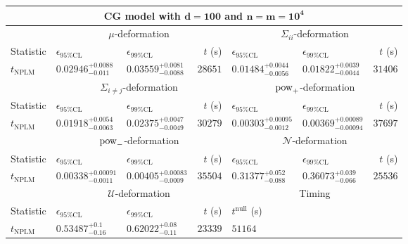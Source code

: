\begin{tabular}{l|llr|llr}
	\toprule
	\multicolumn{7}{c}{{\bf CG model with $\mathbf{d=100}$ and $\mathbf{n=m=10^{4}}$}} \\
	\toprule
	\multicolumn{1}{c}{} & \multicolumn{3}{c}{$\mu$-deformation} & \multicolumn{3}{c}{$\Sigma_{ii}$-deformation} \\
	Statistic & $\epsilon_{95\%\mathrm{CL}}$ & $\epsilon_{99\%\mathrm{CL}}$ & $t$ (s) & $\epsilon_{95\%\mathrm{CL}}$ & $\epsilon_{99\%\mathrm{CL}}$ & $t$ (s) \\
	\midrule
	$t_{\mathrm{NPLM}}$ & $0.02946_{-0.011}^{+0.0088}$ & $0.03559_{-0.0088}^{+0.0081}$ & $28651$ & $0.01484_{-0.0056}^{+0.0044}$ & $0.01822_{-0.0044}^{+0.0039}$ & $31406$ \\
	\toprule
	\multicolumn{1}{c}{} & \multicolumn{3}{c}{$\Sigma_{i\neq j}$-deformation} & \multicolumn{3}{c}{$\rm{pow}_{+}$-deformation} \\
	Statistic & $\epsilon_{95\%\mathrm{CL}}$ & $\epsilon_{99\%\mathrm{CL}}$ & $t$ (s) & $\epsilon_{95\%\mathrm{CL}}$ & $\epsilon_{99\%\mathrm{CL}}$ & $t$ (s) \\
	\midrule
	$t_{\mathrm{NPLM}}$ & $0.01918_{-0.0063}^{+0.0054}$ & $0.02375_{-0.0049}^{+0.0047}$ & $30279$ & $0.00303_{-0.0012}^{+0.00095}$ & $0.00369_{-0.00094}^{+0.00089}$ & $37697$ \\
	\toprule
	\multicolumn{1}{c}{} & \multicolumn{3}{c}{$\rm{pow}_{-}$-deformation} & \multicolumn{3}{c}{$\mathcal{N}$-deformation} \\
	Statistic & $\epsilon_{95\%\mathrm{CL}}$ & $\epsilon_{99\%\mathrm{CL}}$ & $t$ (s) & $\epsilon_{95\%\mathrm{CL}}$ & $\epsilon_{99\%\mathrm{CL}}$ & $t$ (s) \\
	\midrule
	$t_{\mathrm{NPLM}}$ & $0.00338_{-0.0011}^{+0.00091}$ & $0.00405_{-0.0009}^{+0.00083}$ & $35504$ & $0.31377_{-0.088}^{+0.052}$ & $0.36073_{-0.066}^{+0.039}$ & $25536$ \\
	\toprule
	\multicolumn{1}{c}{} & \multicolumn{3}{c}{$\mathcal{U}$-deformation} & \multicolumn{3}{c}{Timing} \\
	Statistic & $\epsilon_{95\%\mathrm{CL}}$ & $\epsilon_{99\%\mathrm{CL}}$ & $t$ (s) & $t^{\mathrm{null}}$ (s) \\
	\midrule
	$t_{\mathrm{NPLM}}$ & $0.53487_{-0.16}^{+0.1}$ & $0.62022_{-0.11}^{+0.08}$ & $23339$ & $51164$ \\
	\bottomrule
\end{tabular}